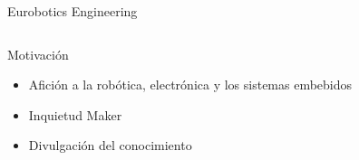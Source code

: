 \documentclass{beamer}
\begin{document}
\begin{frame}{Eurobotics Engineering}
\begin{columns}


\end{columns}
\end{frame}

\begin{frame}{Motivación}

\begin{itemize}
\item Afición a la robótica, electrónica y los sistemas embebidos
\item Inquietud Maker
\item Divulgación del conocimiento
\end{itemize}

\end{frame}
\end{document}
